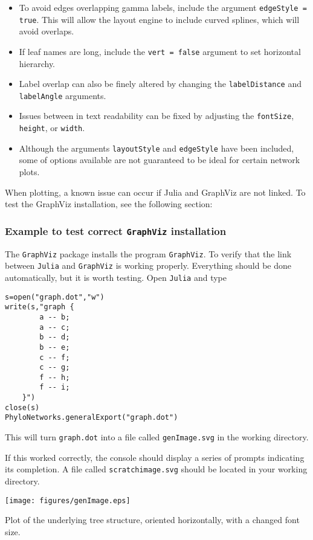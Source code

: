 \documentclass[12pt]{article}
\begin{document}
\begin{itemize}
\item To avoid edges overlapping gamma labels, include the argument
  \texttt{edgeStyle = true}. This will allow the layout engine to
  include curved splines, which will avoid overlaps.
\item If leaf names are long, include the \texttt{vert = false}
  argument to set horizontal hierarchy.
\item Label overlap can also be finely altered by changing the
  \texttt{labelDistance} and \texttt{labelAngle} arguments.
\item Issues between in text readability can be fixed by adjusting the
  \texttt{fontSize}, \texttt{height}, or \texttt{width}.
\item Although the arguments \texttt{layoutStyle} and
  \texttt{edgeStyle} have been included, some of options available are
  not guaranteed to be ideal for certain network plots.
\end{itemize}

When plotting, a known issue can occur if Julia and GraphViz are not
linked. To test the GraphViz installation, see the following section:

\subsubsection{Example to test correct \texttt{GraphViz} installation}

The \texttt{GraphViz} package installs the program
\texttt{GraphViz}. To verify that the link between \texttt{Julia} and
\texttt{GraphViz} is working properly. Everything should be done
automatically, but it is worth testing.  Open \texttt{Julia} and type
\begin{lstlisting}
s=open("graph.dot","w")
write(s,"graph {
		a -- b;
		a -- c;
		b -- d;
		b -- e;
		c -- f;
		c -- g;
        f -- h;
        f -- i;
	}")
close(s)
PhyloNetworks.generalExport("graph.dot")
\end{lstlisting}
This will turn
\texttt{graph.dot} into a file called \texttt{genImage.svg} in the
working directory.

\noindent If this worked correctly, the console should display a series of prompts indicating its completion.
A file called \texttt{scratchimage.svg} should be located in your working directory.

\begin{center}
  \texttt{[image: figures/genImage.eps]}
\end{center}
Plot of the underlying tree structure, oriented horizontally, with a changed font size.
\end{document}
